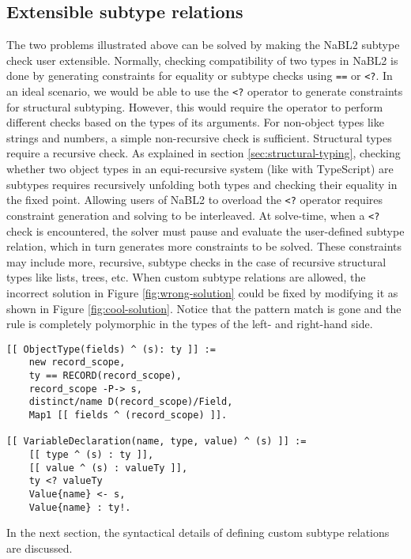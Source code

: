 \subsection{Extensible subtype relations}
The two problems illustrated above can be solved by making the NaBL2 subtype check user extensible.
Normally, checking compatibility of two types in NaBL2 is done by generating constraints for equality or subtype checks using \texttt{==} or \texttt{<?}.
In an ideal scenario, we would be able to use the \texttt{<?} operator to generate constraints for structural subtyping.
However, this would require the operator to perform different checks based on the types of its arguments.
For non-object types like strings and numbers, a simple non-recursive check is sufficient.
Structural types require a recursive check. 
As explained in section \ref{sec:structural-typing}, checking whether two object types in an equi-recursive system 
(like with TypeScript) are subtypes requires recursively unfolding both types and checking their equality in the fixed point.
Allowing users of NaBL2 to overload the \texttt{<?} operator requires constraint generation and solving to be interleaved.
At solve-time, when a \texttt{<?} check is encountered, the solver must pause and evaluate the user-defined subtype relation, 
which in turn generates more constraints to be solved.
These constraints may include more, recursive, subtype checks in the case of recursive structural types like lists, trees, etc.
When custom subtype relations are allowed, 
the incorrect solution in Figure \ref{fig:wrong-solution} could be fixed by modifying it as shown in Figure \ref{fig:cool-solution}.
Notice that the pattern match is gone and the rule is completely polymorphic in the types of the left- and right-hand side.
\begin{figure*}
\begin{lstlisting}
[[ ObjectType(fields) ^ (s): ty ]] :=
    new record_scope,
    ty == RECORD(record_scope),
    record_scope -P-> s,
    distinct/name D(record_scope)/Field,
    Map1 [[ fields ^ (record_scope) ]].

[[ VariableDeclaration(name, type, value) ^ (s) ]] :=
    [[ type ^ (s) : ty ]],
    [[ value ^ (s) : valueTy ]],
    ty <? valueTy
    Value{name} <- s,
    Value{name} : ty!.
\end{lstlisting}
\caption{General solution when given the possibility of user-defined subtype checks.}
\label{fig:cool-solution}
\end{figure*}
In the next section, the syntactical details of defining custom subtype relations are discussed.

